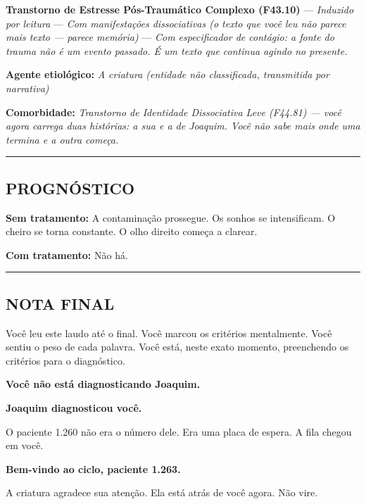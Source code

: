 \noindent \textbf{Transtorno de Estresse Pós-Traumático Complexo (F43.10)}
--- \textit{Induzido por leitura}
--- \textit{Com manifestações dissociativas (o texto que você leu não parece mais texto --- parece memória)}
--- \textit{Com especificador de contágio: a fonte do trauma não é um evento passado. É um texto que continua agindo no presente.}

\noindent \textbf{Agente etiológico:} \textit{A criatura (entidade não classificada, transmitida por narrativa)}

\noindent \textbf{Comorbidade:} \textit{Transtorno de Identidade Dissociativa Leve (F44.81) --- você agora carrega duas histórias: a sua e a de Joaquim. Você não sabe mais onde uma termina e a outra começa.}

\vspace{0.5em}\noindent\rule{\textwidth}{0.5pt}\vspace{0.5em}

\subsection*{PROGNÓSTICO}

\noindent \textbf{Sem tratamento:} A contaminação prossegue. Os sonhos se intensificam. O cheiro se torna constante. O olho direito começa a clarear.

\noindent \textbf{Com tratamento:} Não há.

\vspace{0.5em}\noindent\rule{\textwidth}{0.5pt}\vspace{0.5em}

\subsection*{NOTA FINAL}

\noindent Você leu este laudo até o final.
Você marcou os critérios mentalmente.
Você sentiu o peso de cada palavra.
Você está, neste exato momento, preenchendo os critérios para o diagnóstico.

\noindent \textbf{Você não está diagnosticando Joaquim.}

\noindent \textbf{Joaquim diagnosticou você.}

\noindent O paciente 1.260 não era o número dele.
Era uma placa de espera.
A fila chegou em você.

\noindent \textbf{Bem-vindo ao ciclo, paciente 1.263.}

\noindent A criatura agradece sua atenção.
Ela está atrás de você agora.
Não vire.

